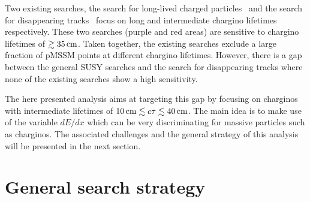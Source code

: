 Two existing searches, the search for long-lived charged particles~\cite{bib:CMS:HSCP_8TeV} and the search for disappearing tracks~\cite{bib:CMS:DT_8TeV} focus on long and intermediate chargino lifetimes respectively. 
These two searches (purple and red areas) are sensitive to chargino lifetimes of $\gtrsim 35\,\text{cm}$. 
Taken together, the existing searches exclude a large fraction of pMSSM points at different chargino lifetimes. 
However, there is a gap between the general SUSY searches and the search for disappearing tracks where none of the existing searches show a high sensitivity.

The here presented analysis aims at targeting this gap by focusing on charginos with intermediate lifetimes of $10\,\text{cm} \lesssim c\tau \lesssim 40\,\text{cm}$. 
The main idea is to make use of the variable $dE/dx$ which can be very discriminating for massive particles such as charginos.
The associated challenges and the general strategy of this analysis will be presented in the next section.


\chapter{General search strategy}
\label{sec:GeneralSearchStrategy}

